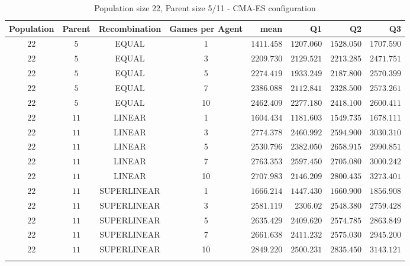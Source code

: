 \begin{table}[H]
\centering
\small
\begin{tabular}{c c c c r r r r}
Population & Parent & Recombination & Games per Agent & mean & Q1 & Q2 & Q3\\
\hline
$22$ & $5$ & EQUAL & 1 & $1411.458$ & $1207.060$ & $1528.050$ & $1707.590$\\
$22$ & $5$ & EQUAL & 3 & $2209.730$ & $2129.521$ & $2213.285$ & $2471.751$\\
$22$ & $5$ & EQUAL & 5 & $2274.419$ & $1933.249$ & $2187.800$ & $2570.399$\\
$22$ & $5$ & EQUAL & 7 & $2386.088$ & $2112.841$ & $2328.500$ & $2573.261$\\
\hdashline
$22$ & $5$ & EQUAL & 10 & $2462.409$ & $2277.180$ & $2418.100$ & $2600.411$\\
\hdashline
$22$ & $11$ & LINEAR & 1 & $1604.434$ & $1181.603$ & $1549.735$ & $1678.111$\\
$22$ & $11$ & LINEAR & 3 & $2774.378$ & $2460.992$ & $2594.900$ & $3030.310$\\
$22$ & $11$ & LINEAR & 5 & $2530.796$ & $2382.050$ & $2658.915$ & $2990.851$\\
\hdashline
$22$ & $11$ & LINEAR & 7 & $2763.353$ & $2597.450$ & $2705.080$ & $3000.242$\\
\hdashline
$22$ & $11$ & LINEAR & 10 & $2707.983$ & $2146.209$ & $2800.435$ & $3273.401$\\
$22$ & $11$ & SUPERLINEAR & 1 & $1666.214$ & $1447.430$ & $1660.900$ & $1856.908$\\
$22$ & $11$ & SUPERLINEAR & 3 & $2581.119$ & $2306.02$ & $2548.380$ & $2759.428$\\
$22$ & $11$ & SUPERLINEAR & 5 & $2635.429$ & $2409.620$ & $2574.785$ & $2863.849$\\
$22$ & $11$ & SUPERLINEAR & 7 & $2661.638$ & $2411.232$ & $2575.030$ & $2945.200$\\
\hdashline
$22$ & $11$ & SUPERLINEAR & 10 & $2849.220$ & $2500.231$ & $2835.450$ & $3143.121$\\
\hdashline
\end{tabular}
\caption{Population size 22, Parent size 5/11 - CMA-ES configuration}
\end{table}


